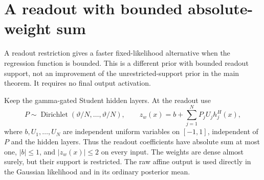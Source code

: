 \section{A readout with bounded absolute-weight sum}
\label{sec:bounded-readout-endpoint}
A readout restriction gives a faster fixed-likelihood alternative when the
regression function is bounded.  This is a different prior with bounded
readout support, not an improvement of the unrestricted-support prior in
the main theorem.  It requires no final output activation.

Keep the gamma-gated Student hidden layers.  At the readout use
\[
 P\sim\operatorname{Dirichlet}(\vartheta/N,\ldots,\vartheta/N),\qquad
 z_w(x)=b+\sum_{j=1}^N P_jU_jh_j^H(x),
\]
where $b,U_1,\ldots,U_N$ are independent uniform variables on $[-1,1]$,
independent of $P$ and the hidden layers.  Thus the readout coefficients
have absolute sum at most one, $|b|\le1$, and $|z_w(x)|\le2$ on every
input.  The weights are dense almost surely, but their support is
restricted.  The raw affine output is used directly in the Gaussian
likelihood and in its ordinary posterior mean.

